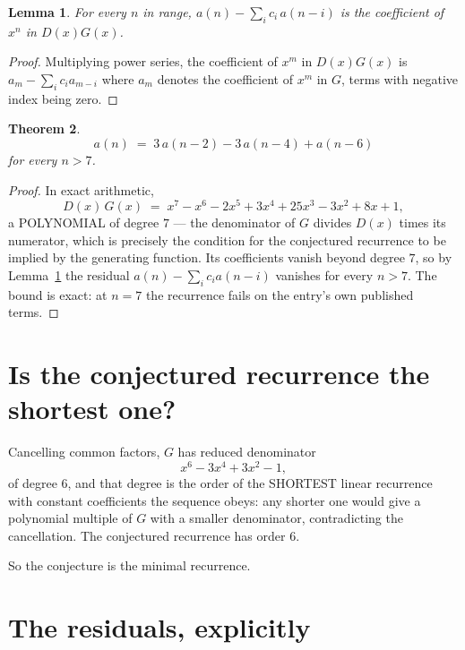 \documentclass[11pt,a4paper]{article}
\theoremstyle{plain}
\newtheorem{theorem}{Theorem}
\newtheorem{lemma}[theorem]{Lemma}
\theoremstyle{definition}
\begin{document}
\begin{lemma}\label{lem:key}
For every $n$ in range, $a(n)-\sum_i c_i\,a(n-i)$ is the coefficient of $x^{n}$ in
$D(x)G(x)$.
\end{lemma}

\begin{proof}
Multiplying power series, the coefficient of $x^{m}$ in $D(x)G(x)$ is
$a_m-\sum_i c_i a_{m-i}$ where $a_m$ denotes the coefficient of $x^{m}$ in $G$, terms with
negative index being zero.
\end{proof}

\begin{theorem}
\[
a(n)\;=\;3\,a(n-2) - 3\,a(n-4) + a(n-6)
\]
for every $n>7$.
\end{theorem}

\begin{proof}
In exact arithmetic,
\[
D(x)\,G(x)\;=\;x^{7} - x^{6} - 2 x^{5} + 3 x^{4} + 25 x^{3} - 3 x^{2} + 8 x + 1,
\]
a POLYNOMIAL of degree $7$ --- the denominator of $G$ divides $D(x)$ times its numerator,
which is precisely the condition for the conjectured recurrence to be implied by the
generating function. Its coefficients vanish beyond degree $7$, so by
Lemma~\ref{lem:key} the residual $a(n)-\sum_ic_ia(n-i)$ vanishes for every
$n>7$. The bound is exact: at $n=7$ the recurrence fails on the entry's own published terms.
\end{proof}

\section{Is the conjectured recurrence the shortest one?}

Cancelling common factors, $G$ has reduced denominator
\[
x^{6} - 3 x^{4} + 3 x^{2} - 1,
\]
of degree $6$, and that degree is the order of the SHORTEST linear recurrence with
constant coefficients the sequence obeys: any shorter one would give a polynomial multiple of
$G$ with a smaller denominator, contradicting the cancellation. The conjectured recurrence has
order $6$.

So the conjecture is the minimal recurrence.

\section{The residuals, explicitly}
\end{document}
